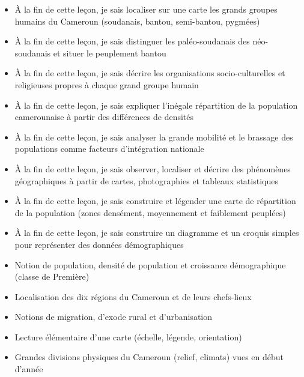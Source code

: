 \documentclass[11pt]{article}
\begin{document}
\begin{objectifs}
\begin{itemize}
\item À la fin de cette leçon, je sais localiser sur une carte les grands groupes humains du Cameroun (soudanais, bantou, semi-bantou, pygmées)
\item À la fin de cette leçon, je sais distinguer les paléo-soudanais des néo-soudanais et situer le peuplement bantou
\item À la fin de cette leçon, je sais décrire les organisations socio-culturelles et religieuses propres à chaque grand groupe humain
\item À la fin de cette leçon, je sais expliquer l'inégale répartition de la population camerounaise à partir des différences de densités
\item À la fin de cette leçon, je sais analyser la grande mobilité et le brassage des populations comme facteurs d'intégration nationale
\item À la fin de cette leçon, je sais observer, localiser et décrire des phénomènes géographiques à partir de cartes, photographies et tableaux statistiques
\item À la fin de cette leçon, je sais construire et légender une carte de répartition de la population (zones densément, moyennement et faiblement peuplées)
\item À la fin de cette leçon, je sais construire un diagramme et un croquis simples pour représenter des données démographiques
\end{itemize}
\end{objectifs}

\begin{prerequis}
\begin{itemize}
\item Notion de population, densité de population et croissance démographique (classe de Première)
\item Localisation des dix régions du Cameroun et de leurs chefs-lieux
\item Notions de migration, d'exode rural et d'urbanisation
\item Lecture élémentaire d'une carte (échelle, légende, orientation)
\item Grandes divisions physiques du Cameroun (relief, climats) vues en début d'année
\end{itemize}
\end{prerequis}

\newpage
\end{document}

